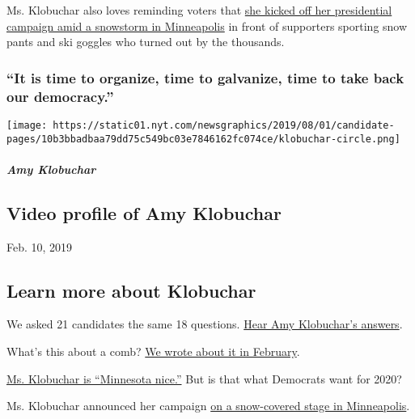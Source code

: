 Ms. Klobuchar also loves reminding voters that
\href{https://www.nytimes.com/2019/02/10/us/politics/amy-klobuchar-president-2020.html}{she
kicked off her presidential campaign amid a snowstorm in Minneapolis} in
front of supporters sporting snow pants and ski goggles who turned out
by the thousands.

\hypertarget{it-is-time-to-organize-time-to-galvanize-time-to-take-back-our-democracy}{%
\subsubsection{``It is time to organize, time to galvanize, time to take
back our
democracy.''}\label{it-is-time-to-organize-time-to-galvanize-time-to-take-back-our-democracy}}

\texttt{[image: https://static01.nyt.com/newsgraphics/2019/08/01/candidate-pages/10b3bbadbaa79dd75c549bc03e7846162fc074ce/klobuchar-circle.png]}

\hypertarget{amy-klobuchar-1}{%
\subparagraph{Amy Klobuchar}\label{amy-klobuchar-1}}

\hypertarget{video-profile-of-amy-klobuchar}{%
\subsection{Video profile of Amy
Klobuchar}\label{video-profile-of-amy-klobuchar}}

Feb. 10, 2019

\hypertarget{learn-more-about-klobuchar}{%
\subsection{Learn more about
Klobuchar}\label{learn-more-about-klobuchar}}

We asked 21 candidates the same 18 questions.
\href{https://www.nytimes.com/interactive/2019/us/politics/amy-klobuchar-2020-campaign.html}{Hear
Amy Klobuchar's answers}.

What's this about a comb?
\href{https://www.nytimes.com/interactive/2019/us/politics/amy-klobuchar-2020-campaign.html}{We
wrote about it in February}.

\href{https://www.nytimes.com/2018/11/26/us/politics/amy-klobuchar-2020-election.html}{Ms.
Klobuchar is ``Minnesota nice.''} But is that what Democrats want for
2020?

Ms. Klobuchar announced her campaign
\href{https://www.nytimes.com/2019/02/10/us/politics/amy-klobuchar-president-2020.html}{on
a snow-covered stage in Minneapolis}.

